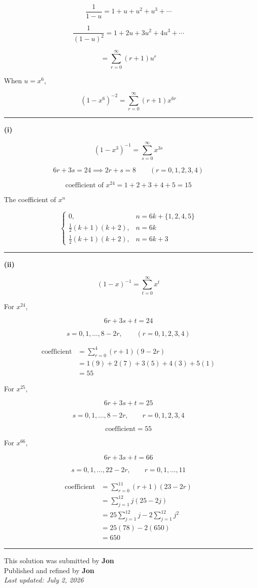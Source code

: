 \documentclass[12pt]{article}
\begin{document}
\newcommand{\ds}{\displaystyle}

$$\frac1{1-u}=1+u+u^2+u^3+\cdots$$

$$\frac1{(1-u)^2}=1+2u+3u^2+4u^3+\cdots$$

$$=\sum_{r=0}^{\infty}(r+1)u^r$$

When $\ds u=x^6$,

$$\ds (1-x^6)^{-2}=\sum_{r=0}^{\infty}(r+1)x^{6r}$$

\bigskip\hrule\bigskip

\textbf{(i)}

$$(1-x^3)^{-1}=\sum_{s=0}^{\infty}x^{3s}$$


$$6r+3s=24\implies 2r+s=8\qquad (r=0,1,2,3,4)$$

$$\text{coefficient of }x^{24}=1+2+3+4+5=15$$

The coefficient of $x^n$

$$
\begin{cases}
0, & n=6k+\{1,2,4,5\}\\[6pt]
\ds \frac12(k+1)(k+2), & n=6k\\[8pt]
\ds \frac12(k+1)(k+2), & n=6k+3 
\end{cases}
$$

\bigskip\hrule\bigskip

\textbf{(ii)}

$$(1-x)^{-1}=\sum_{t=0}^{\infty}x^t$$

For $x^{24}$,

$$6r+3s+t=24$$

$$s=0,1,\ldots,8-2r,\qquad (r=0,1,2,3,4)$$

\begin{align*}
\text{coefficient}
&=\sum_{r=0}^{4}(r+1)(9-2r)\\
&=1(9)+2(7)+3(5)+4(3)+5(1)\\
&=55
\end{align*}

For $x^{25}$,

$$6r+3s+t=25$$

$$s=0,1,\ldots,8-2r,\qquad r=0,1,2,3,4$$

$$\text{coefficient}=55$$

For $x^{66}$,

$$6r+3s+t=66$$

$$s=0,1,\ldots,22-2r,\qquad r=0,1,\ldots,11$$

\begin{align*}
\text{coefficient}
&=\sum_{r=0}^{11}(r+1)(23-2r)\\
&=\sum_{j=1}^{12}j(25-2j)\\
&=25\sum_{j=1}^{12}j-2\sum_{j=1}^{12}j^2\\
&=25(78)-2(650)\\
&=650
\end{align*}

\bigskip
\hrule
\begin{center}
    This solution was submitted by \textbf{Jon}\\[4pt]
    Published and refined by \textbf{Jon}\\[8pt]
    \textit{Last updated: July 2, 2026}
\end{center}
\end{document}
